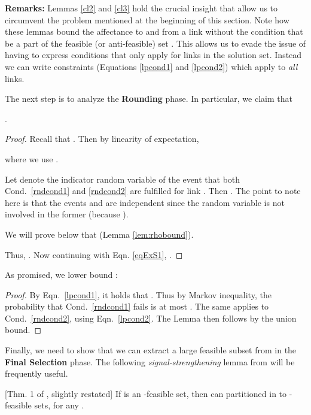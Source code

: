 \documentclass[11pt]{amsart}
\begin{document}
{\bf Remarks:} Lemmas \ref{cl2} and \ref{cl3} hold the crucial insight that allow us to circumvent the problem mentioned at the beginning
of this section. Note how these lemmas bound the affectance to and from a link  without the condition that  
be a part of the feasible (or anti-feasible) set . This allows us to evade the issue of having to express conditions
that only apply for links in the solution set. Instead we can write constraints (Equations
\ref{lpcond1} and \ref{lpcond2}) which apply to \emph{all} links.


The next step is to analyze the {\bf Rounding} phase. In particular, we claim that 
\begin{lemma}
.
\end{lemma}
\begin{proof}
Recall that . Then
by linearity of expectation, 


where we use .

Let  denote the indicator random variable of the event that both Cond.\ 
\ref{rndcond1} and \ref{rndcond2} are fulfilled for link . Then  .
The point to note here is that the events  and  are independent since
the random variable  is not involved in the former (because ). 

We will prove below that  (Lemma \ref{lem:rhobound}).

Thus, . Now continuing with Eqn. \ref{eqExS1},  .

\end{proof}


As promised, we lower bound :
\begin{lemma}

\label{lem:rhobound}
\end{lemma}
\begin{proof}
By  Eqn.~\ref{lpcond1}, it holds that
.
Thus by Markov inequality, the probability that Cond.\ \ref{rndcond1} 
fails is at most .
The same applies to Cond.\ \ref{rndcond2}, using Eqn.~\ref{lpcond2}.
The Lemma then follows by the union bound. 
\end{proof}


Finally, we need to show that we can extract a large feasible subset from  in the {\bf Final Selection} phase. 
The following \emph{signal-strengthening} lemma from \cite{HW09}
will be frequently useful.
\begin{lemma}{[Thm. 1 of \cite{HW09}, slightly restated]}
If  is an -feasible set, 
then  can partitioned in to  -feasible sets,
for any .
\label{lem:signal}
\end{lemma}
\end{document}
